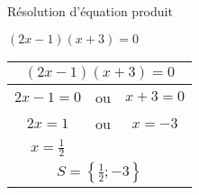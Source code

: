 
Résolution d'équation produit

$(2x-1)(x+3)=0$

\begin{tabular}{|c|c|c|}
\hline 
\multicolumn{3}{c|}{$(2x-1)(x+3)=0$} \\ 
\hline 
$2x-1=0$ & ou & $x+3=0$ \\ 
\hline 
$2x=1$ & ou & $x=-3$ \\ 
\hline 
$x=\frac{1}{2}$ &  &  \\ 
\hline 
\multicolumn{3}{c|}{$S=\left\lbrace \frac{1}{2}; -3 \right\rbrace $}\\ 
\hline 
\end{tabular} 